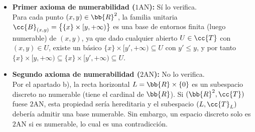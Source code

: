 \documentclass[12pt]{article}
\begin{document}
\begin{ejercicio}
\begin{enumerate}[label=\alph*)]
\begin{itemize}
        \begin{center}
        \end{center}

        \item \textbf{Primer axioma de numerabilidad ($1\mathrm{AN}$):} Sí lo verifica.\\
        Para cada punto $(x, y) \in \bb{R}^2$, la familia unitaria $\cc{B}_{(x, y)} = \big\{ \{x\} \times [y, +\infty) \big\}$ es una base de entornos finita (luego numerable) de $(x, y)$, ya que dado cualquier abierto $U \in \cc{T}$ con $(x, y) \in U$, existe un básico $\{x\} \times [y', +\infty) \subseteq U$ con $y' \leq y$, y por tanto $\{x\} \times [y, +\infty) \subseteq \{x\} \times [y', +\infty) \subseteq U$.

        \item \textbf{Segundo axioma de numerabilidad ($2\mathrm{AN}$):} No lo verifica.\\
        Por el apartado b), la recta horizontal $L = \bb{R} \times \{0\}$ es un subespacio discreto no numerable (tiene el cardinal de $\bb{R}$). Si $(\bb{R}^2, \cc{T})$ fuese $2\mathrm{AN}$, esta propiedad sería hereditaria y el subespacio $(L, \cc{T}_L)$ debería admitir una base numerable. Sin embargo, un espacio discreto solo es $2\mathrm{AN}$ si es numerable, lo cual es una contradicción.
    \end{itemize}
\end{enumerate}
\end{ejercicio}
\end{document}

